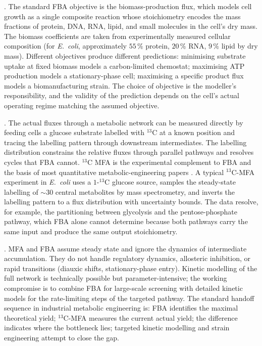 . The standard FBA objective is the
biomass-production flux, which models cell growth as a single
composite reaction whose stoichiometry encodes the mass fractions of
protein, DNA, RNA, lipid, and small molecules in the cell's dry
mass. The biomass coefficients are taken from experimentally
measured cellular composition (for \emph{E.~coli}, approximately
$55\,\%$ protein, $20\,\%$ RNA, $9\,\%$ lipid by dry mass). Different
objectives produce different predictions: minimising substrate
uptake at fixed biomass models a carbon-limited chemostat; maximising
ATP production models a stationary-phase cell; maximising a specific
product flux models a biomanufacturing strain. The choice of
objective is the modeller's responsibility, and the validity of the
prediction depends on the cell's actual operating regime matching
the assumed objective.

. The actual fluxes through
a metabolic network can be measured directly by feeding cells a
glucose substrate labelled with $^{13}$C at a known position and
tracing the labelling pattern through downstream intermediates. The
labelling distribution constrains the relative fluxes through
parallel pathways and resolves cycles that FBA cannot. $^{13}$C MFA
is the experimental complement to FBA and the basis of most
quantitative metabolic-engineering papers
\cite[ch.~3]{text:alon-systems-biology}. A typical $^{13}$C-MFA
experiment in \emph{E.~coli} uses a $1$-$^{13}$C glucose source,
samples the steady-state labelling of $\sim 30$ central metabolites
by mass spectrometry, and inverts the labelling pattern to a flux
distribution with uncertainty bounds. The data resolve, for example,
the partitioning between glycolysis and the pentose-phosphate pathway,
which FBA alone cannot determine because both pathways carry the same
input and produce the same output stoichiometry.

. MFA and FBA assume steady state and ignore
the dynamics of intermediate accumulation. They do not handle
regulatory dynamics, allosteric inhibition, or rapid transitions
(diauxic shifts, stationary-phase entry). Kinetic modelling of the
full network is technically possible but parameter-intensive; the
working compromise is to combine FBA for large-scale screening with
detailed kinetic models for the rate-limiting steps of the targeted
pathway. The standard handoff sequence in industrial metabolic
engineering is: FBA identifies the maximal theoretical yield;
$^{13}$C-MFA measures the current actual yield; the difference
indicates where the bottleneck lies; targeted kinetic modelling and
strain engineering attempt to close the gap.


